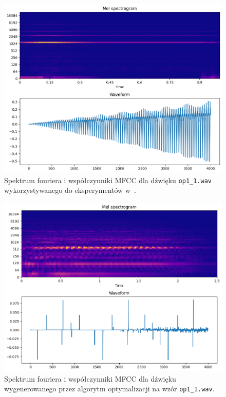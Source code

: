 \begin{multicols}{3}
\begin{figure}[H]
    \centering
    \includegraphics[width=0.9\linewidth]{rys06/target_sample_op1_literature.png}
    \caption{
      Spektrum fouriera i współczynniki MFCC dla dźwięku \texttt{op1\_1.wav} wykorzystywanego
      do eksperymentów w~\cite{evolutionary_puredata_results}.
    }\label{fig:literature_op_1_sound_overview}
\end{figure}


\begin{figure}[H]
    \centering
    \includegraphics[width=0.9\linewidth]{rys06/evolved_sample_op1.png}
    \caption{
      Spektrum fouriera i współczynniki MFCC dla dźwięku wygenerowanego
      przez algorytm optymalizacji na wzór \texttt{op1\_1.wav}.
    }\label{fig:evolved_op1_sound_overview}
\end{figure}



\end{multicols}
